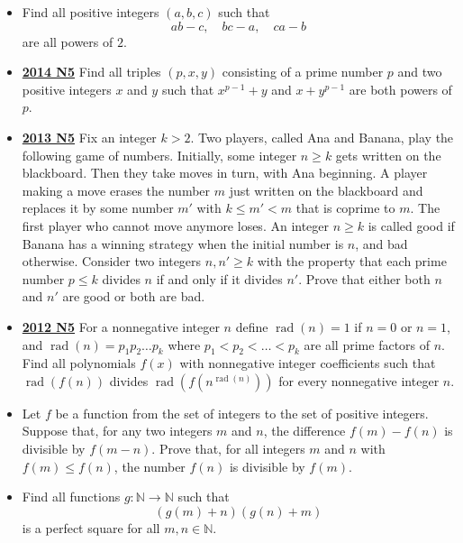 \documentclass[11pt]{scrartcl}
\begin{document}
\begin{itemize}[leftmargin=*]
\item {} Find all positive integers $(a,b,c)$ such that
$$ab-c,\quad bc-a,\quad ca-b$$are all powers of $2$.
\item \href{https://artofproblemsolving.com/community/c6h1113199p5083571}{\textbf{2014 N5}} Find all triples $(p, x, y)$ consisting of a prime number $p$ and two positive integers $x$ and $y$ such that $x^{p -1} + y$ and $x + y^ {p -1}$ are both powers of $p$.
\item \href{https://artofproblemsolving.com/community/c6h597247p3544105}{\textbf{2013 N5}} 	Fix an integer $k>2$. Two players, called Ana and Banana, play the following game of numbers. Initially, some integer $n \geqslant  k$ gets written on the blackboard. Then they take moves in turn, with Ana beginning. A player making a move erases the number $m$ just written on the blackboard and replaces it by some number $m'$ with $k \leqslant m' < m$ that is coprime to $m$. The first player who cannot move anymore loses. An integer $n \geqslant  k $ is called good if Banana has a winning strategy when the initial number is $n$, and bad otherwise. Consider two integers $n,n' \geqslant  k$ with the property that each prime number $p \leqslant k$ divides $n$ if and only if it divides $n'$. Prove that either both $n$ and $n'$ are good or both are bad.
\item \href{https://artofproblemsolving.com/community/c6h546191p3160608}{\textbf{2012 N5}} For a nonnegative integer $n$ define $\operatorname{rad}(n)=1$ if $n=0$ or $n=1$, and $\operatorname{rad}(n)=p_1p_2\dots p_k$ where $p_1<p_2<\dots <p_k$ are all prime factors of $n$. Find all polynomials $f(x)$ with nonnegative integer coefficients such that $\operatorname{rad}(f(n))$ divides $\operatorname{rad}(f(n^{\operatorname{rad}(n)}))$ for every nonnegative integer $n$.

\item {} Let $f$ be a function from the set of integers to the set of positive integers. Suppose that, for any two integers $m$ and $n$, the difference $f(m) - f(n)$ is divisible by $f(m- n)$. Prove that, for all integers $m$ and $n$ with $f(m) \leqslant f(n)$, the number $f(n)$ is divisible by $f(m)$.

\item {} Find all functions $g:\mathbb{N}\rightarrow\mathbb{N}$ such that\[\left(g(m)+n\right)\left(g(n)+m\right)\]is a perfect square for all $m,n\in\mathbb{N}$.


\end{itemize}
\end{document}
